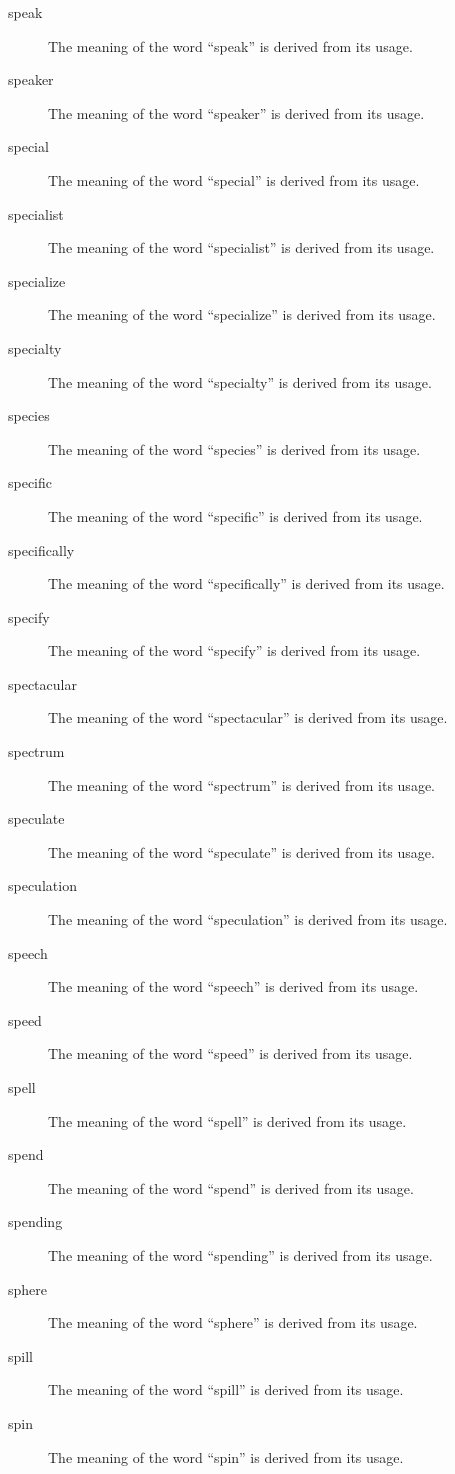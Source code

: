 \documentclass[12pt, letterpaper]{memoir}
\begin{document}
\begin{description}
\item[speak] The meaning of the word ``speak'' is derived from its usage.
\item[speaker] The meaning of the word ``speaker'' is derived from its usage.
\item[special] The meaning of the word ``special'' is derived from its usage.
\item[specialist] The meaning of the word ``specialist'' is derived from its usage.
\item[specialize] The meaning of the word ``specialize'' is derived from its usage.
\item[specialty] The meaning of the word ``specialty'' is derived from its usage.
\item[species] The meaning of the word ``species'' is derived from its usage.
\item[specific] The meaning of the word ``specific'' is derived from its usage.
\item[specifically] The meaning of the word ``specifically'' is derived from its usage.
\item[specify] The meaning of the word ``specify'' is derived from its usage.
\item[spectacular] The meaning of the word ``spectacular'' is derived from its usage.
\item[spectrum] The meaning of the word ``spectrum'' is derived from its usage.
\item[speculate] The meaning of the word ``speculate'' is derived from its usage.
\item[speculation] The meaning of the word ``speculation'' is derived from its usage.
\item[speech] The meaning of the word ``speech'' is derived from its usage.
\item[speed] The meaning of the word ``speed'' is derived from its usage.
\item[spell] The meaning of the word ``spell'' is derived from its usage.
\item[spend] The meaning of the word ``spend'' is derived from its usage.
\item[spending] The meaning of the word ``spending'' is derived from its usage.
\item[sphere] The meaning of the word ``sphere'' is derived from its usage.
\item[spill] The meaning of the word ``spill'' is derived from its usage.
\item[spin] The meaning of the word ``spin'' is derived from its usage.

\end{description}
\end{document}
